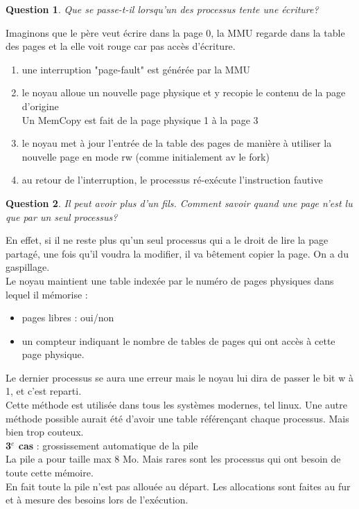 \documentclass[12pt,a4paper]{report}
\newtheorem*{q}{Question}
\begin{document}
\begin{q} Que se passe-t-il lorsqu'un des processus tente une écriture? \end{q}
Imaginons que le père veut écrire dans la page 0, la MMU regarde dans la table des pages et la elle voit rouge car pas accès d'écriture.
\begin{enumerate}
\item une interruption "page-fault" est générée par la MMU
\item le noyau alloue un nouvelle page physique et y recopie le contenu de la page d'origine \\
Un MemCopy est fait de la page physique 1 à la page 3
\item le noyau met à jour l'entrée de la table des pages de manière à utiliser la nouvelle page en mode rw (comme initialement av le fork)
\item au retour de l'interruption, le processus ré-exécute l'instruction fautive
\end{enumerate}



\begin{q}Il peut avoir plus d'un fils. Comment savoir quand une page n'est lu que par un seul processus?\end{q}
En effet, si il ne reste plus qu'un seul processus qui a le droit de lire la page partagé,  une fois qu'il voudra la modifier, il va bêtement copier la page. On a du gaspillage.\\
Le noyau maintient une table indexée par le numéro de pages physiques dans lequel il mémorise :
\begin{itemize}
\item pages libres : oui/non
\item un compteur indiquant le nombre de tables de pages qui ont accès à cette page physique.
\end{itemize}

Le dernier processus se aura une erreur mais le noyau lui dira de passer le bit w à 1, et c'est reparti.\\

Cette méthode est utilisée dans tous les systèmes modernes, tel linux.
Une autre méthode possible aurait été d'avoir une table référençant chaque processus. Mais bien trop couteux.\\

\textbf{3$^e$ cas} : grossissement automatique de la pile\\
La pile a pour taille max 8 Mo. Mais rares sont les processus qui ont besoin de toute cette mémoire.\\
En fait toute la pile n'est pas allouée au départ. Les allocations sont faites au fur et à mesure des besoins lors de l'exécution.\\ 
\end{document}
